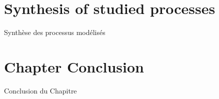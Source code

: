 


\newpage

\section*{Synthesis of studied processes}{Synthèse des processus modélisés}













\newpage


\section*{Chapter Conclusion}{Conclusion du Chapitre}

